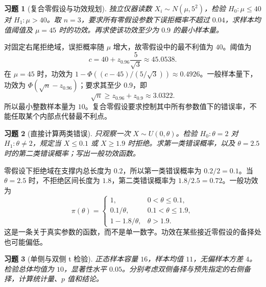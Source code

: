 \documentclass[12pt,fontset=fandol]{ctexart}
\newtheorem{exercise}{习题}[section]
\begin{document}
\begin{exercise}[复合零假设与功效规划]\label{q:M-P8-3}
独立仪器读数 $X_i\sim N(\mu,5^2)$，检验 $H_0:\mu\le40$ 对 $H_1:\mu>40$。取 $n=3$，要求所有零假设参数下误拒概率不超过 $0.04$，求样本均值阈值及 $\mu=45$ 时的功效。再求使该功效至少为 $0.9$ 的最小样本量。\par{}
\end{exercise}

\begin{solve}\label{a:M-P8-3}对固定右尾拒绝域，误拒概率随 $\mu$ 增大，故零假设中的最不利值为 $40$。阈值为\[c=40+z_{0.96}\frac5{\sqrt3}\approx45.0538.\]在 $\mu=45$ 时，功效为 $1-\Phi((c-45)/(5/\sqrt3))\approx0.4926$。一般样本量下，功效为 $\Phi(\sqrt n-z_{0.96})$；要求其至少 $0.9$，即\[\sqrt n\ge z_{0.96}+z_{0.9}\approx3.0322.\]所以最小整数样本量为 $10$。复合零假设要求控制其中所有参数值下的错误率，不能任取某个内部点代替最不利点。\end{solve}

\begin{exercise}[直接计算两类错误]\label{q:M-P8-4}
只观察一次 $X\sim U(0,\theta)$。检验 $H_0:\theta=2$ 对 $H_1:\theta\ne2$，规定当 $X\le0.1$ 或 $X\ge1.9$ 时拒绝。求第一类错误概率，以及 $\theta=2.5$ 时的第二类错误概率；写出一般功效函数。\par{}
\end{exercise}

\begin{solve}\label{a:M-P8-4}零假设下拒绝域在支撑内总长度为 $0.2$，所以第一类错误概率为 $0.2/2=0.1$。当 $\theta=2.5$ 时，不拒绝区间长度为 $1.8$，第二类错误概率为 $1.8/2.5=0.72$。一般功效为\[\pi(\theta)=\begin{cases}1,&0<\theta\le0.1,\\0.1/\theta,&0.1<\theta\le1.9,\\1-1.8/\theta,&\theta>1.9.\end{cases}\]这是一条关于真实参数的函数，而不是单一数字。功效在某些接近零假设的备择处也可能偏低。\end{solve}

\begin{exercise}[单侧与双侧 t 检验]\label{q:M-P9-1}
正态样本容量 $16$，样本均值 $11$，无偏样本方差 $4$。检验总体均值为 $10$，显著性水平 $0.05$。分别考虑双侧备择与预先指定的右侧备择，计算统计量、$p$ 值和结论。\par{}
\end{exercise}
\end{document}
